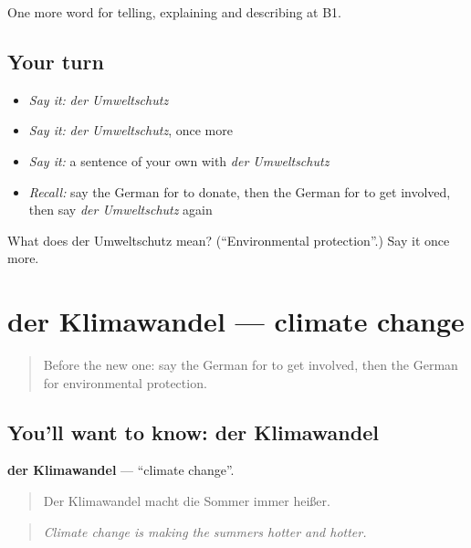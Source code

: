 \begin{grammarlens}[title={What you've built}]
One more word for telling, explaining and describing at B1.
\end{grammarlens}

\subsection*{Your turn}
\begin{itemize}
\raggedright
  \item \emph{Say it:} \emph{der Umweltschutz}
  \item \emph{Say it:} \emph{der Umweltschutz}, once more
  \item \emph{Say it:} a sentence of your own with \emph{der Umweltschutz}
  \item \emph{Recall:} say the German for to donate, then the German for to get involved, then say \emph{der Umweltschutz} again
\end{itemize}

\begin{tcolorbox}[breakable,colback=teal!4,colframe=teal!35!black,title={Before you move on}]
What does der Umweltschutz mean? (\textquotedblleft{}Environmental protection\textquotedblright{}.) Say it once more.
\end{tcolorbox}
\section[der Klimawandel]{der Klimawandel — climate change}

\label{lesson:GE-C363-klimawandel}



\begin{quote}
Before the new one: say the German for to get involved, then the German for environmental protection.
\end{quote}

\subsection*{You'll want to know: der Klimawandel}
\textbf{der Klimawandel} — \textquotedblleft{}climate change\textquotedblright{}.

\begin{quote}
Der Klimawandel macht die Sommer immer heißer.
\end{quote}

\begin{quote}
\emph{Climate change is making the summers hotter and hotter.}
\end{quote}

